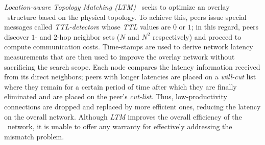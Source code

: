 

\emph{Location-aware Topology Matching (LTM)}~\cite{LLXNZ2004} 
seeks to optimize an overlay \p\ structure based on the physical topology.
To achieve this, peers issue special messages called
\textit{TTL-detector}s whose \emph{TTL} values are $0$ or $1$;
in this regard, peers 
discover $1$- and $2$-hop neighbor sets ($N$ and $N^2$ respectively) %
and proceed to compute communication costs.
Time-stamps are used to derive network latency measurements that are then used 
to improve the overlay network without sacrificing the search scope.
Each node compares the latency information
received from its direct neighbors;
peers with longer latencies are placed on a
\emph{will-cut} list where they remain for a certain period of time 
after which they are finally eliminated 
and are placed on the peer's \emph{cut-list}. 
Thus, low-productivity connections are dropped and replaced by 
more efficient ones, reducing the
latency on the overall network. 
Although \emph{LTM} improves the overall efficiency of
the \p\ network, it is unable to offer any warranty for 
effectively addressing the mismatch problem. %
%
%
